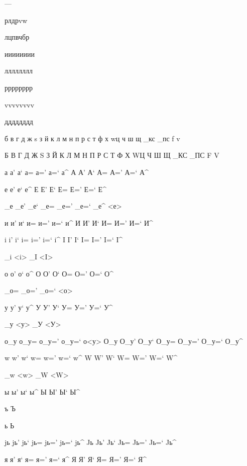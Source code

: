 \documentclass{article}
\begin{document}
\huge
---


р\д л\д д\с р\с v\г w\т

л\с  ц\д  п\с  в\д  ч\с  б\с  р\о

и\х и\н и\р и\ч и\г и\ъ и\ж и\з

л\х л\н л\р л\ч л\г л\ъ л\ж л\з

р\х р\н р\р р\ч р\г р\ъ р\ж р\з

v\х v\н v\р v\ч v\г v\ъ v\ж v\з

д\х д\н д\р д\ч д\г д\ъ д\ж д\з


б в г д ж s з й к л м н п р с т ф х w\т ц ч ш щ _кс _пс f v

Б В Г Д Ж S З Й К Л М Н П Р С Т Ф Х W\т Ц Ч Ш Щ _КС _ПС F V

а а' а` а= а=' а=` а^ А А' А` А= А=' А=` А^

е е' е` е^ Е Е' Е` Е= Е=' Е=` Е^

_е _е' _е` _е= _е=' _е=` _е^ <е>

и и' и` и= и=' и=` и^ И И' И` И= И=' И=` И^

i i' i` i= i=' i=` i^ I I' I` I= I=' I=` I^

_i <i> _I <I>

о о' о` о^ О О' О` О= О=' О=` О^

_о= _о=' _о=` <о>

у у' у` у^ У У' У` У= У=' У=` У^

_у <у> _У <У>

о_у о_у= о_у=' о_у=` о<у> О_у О_у' О_у` О_у= О_у=' О_у=` О_у^

w w' w` w= w=' w=` w^ W W' W` W= W=' W=` W^

_w <w> _W <W>

ы ы' ы` ы^ Ы Ы' Ы` Ы^

ъ Ъ

ь Ь

jь jь' jь` jь= jь=' jь=` jь^ Jь Jь' Jь` Jь= Jь=' Jь=` Jь^

я я' я` я= я=' я=` я^ Я Я' Я` Я= Я=' Я=` Я^
\end{document}
